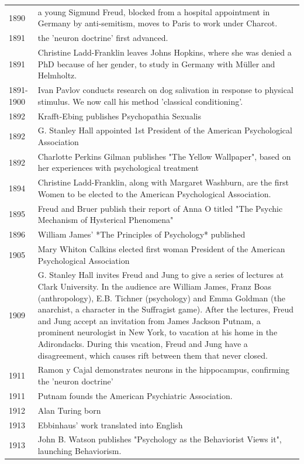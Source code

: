\begin{longtable}[!t]{ | P{2cm} | P{11.8cm} | }
1890&a young Sigmund Freud, blocked from a hospital appointment in Germany by anti-semitism, moves to Paris to work under Charcot. \\
1891&the 'neuron doctrine' first advanced. \\
1891&Christine Ladd-Franklin leaves Johns Hopkins, where she was denied a PhD because of her gender, to study in Germany with Müller and Helmholtz. \\
1891-1900&Ivan Pavlov conducts research on dog salivation in response to physical stimulus. We now call his method 'classical conditioning'. \\
1892&Krafft-Ebing publishes Psychopathia Sexualis \\
1892&G. Stanley Hall appointed 1st President of the American Psychological Association \\
1892&Charlotte Perkins Gilman publishes "The Yellow Wallpaper", based on her experiences with psychological treatment \\
1894&Christine Ladd-Franklin, along with Margaret Washburn, are the first Women to be elected to the American Psychological Association. \\
1895&Freud and Bruer publish their report of Anna O titled "The Psychic Mechanism of Hysterical Phenomena" \\
1896&William James' *The Principles of Psychology* published \\
1905&Mary Whiton Calkins elected first woman President of the American Psychological Association \\
1909&G. Stanley Hall invites Freud and Jung to give a series of lectures at Clark University. In the audience are William James, Franz Boas (anthropology), E.B. Tichner (psychology) and Emma Goldman (the anarchist, a character in the Suffragist game). After the lectures, Freud and Jung accept an invitation from James Jackson Putnam, a prominent neurologist in New York, to vacation at his home in the Adirondacks. During this vacation, Freud and Jung have a disagreement, which causes rift between them that never closed. \\
1911&Ramon y Cajal demonstrates neurons in the hippocampus, confirming the 'neuron doctrine' \\
1911&Putnam founds the American Psychiatric Association. \\
1912&Alan Turing born \\
1913&Ebbinhaus' work translated into English \\
1913&John B. Watson publishes "Psychology as the Behaviorist Views it", launching Behaviorism. \\

\end{longtable}
